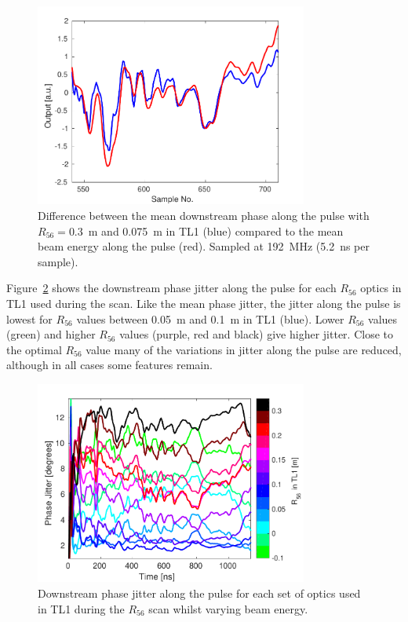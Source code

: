 \begin{figure}
  \centering
  \includegraphics[width=0.8\textwidth]{Figures/propagation/r56Scan_comparisonPhaseEnergy}
  \caption{Difference between the mean downstream phase along the pulse with \(R_{56} = 0.3\)~m and 0.075~m in TL1 (blue) compared to the mean beam energy along the pulse (red). Sampled at 192~MHz (5.2~ns per sample).}
  \label{f:r56Scan_comparisonPhaseEnergy}
\end{figure}

Figure~\ref{f:R56ScanGunWiggle_JitterAlong} shows the downstream phase jitter along the pulse for each \(R_{56}\) optics in TL1 used during the scan. Like the mean phase jitter, the jitter along the pulse is lowest for \(R_{56}\) values between 0.05~m and 0.1~m in TL1 (blue). Lower \(R_{56}\) values (green) and higher \(R_{56}\) values (purple, red and black) give higher jitter. Close to the optimal \(R_{56}\) value many of the variations in jitter along the pulse are reduced, although in all cases some features remain.

\begin{figure}
  \centering
  \includegraphics[width=0.8\textwidth]{Figures/propagation/R56ScanGunWiggle_JitterAlong}
  \caption{Downstream phase jitter along the pulse for each set of optics used in TL1 during the \(R_{56}\) scan whilst varying beam energy.}
  \label{f:R56ScanGunWiggle_JitterAlong}
\end{figure}

